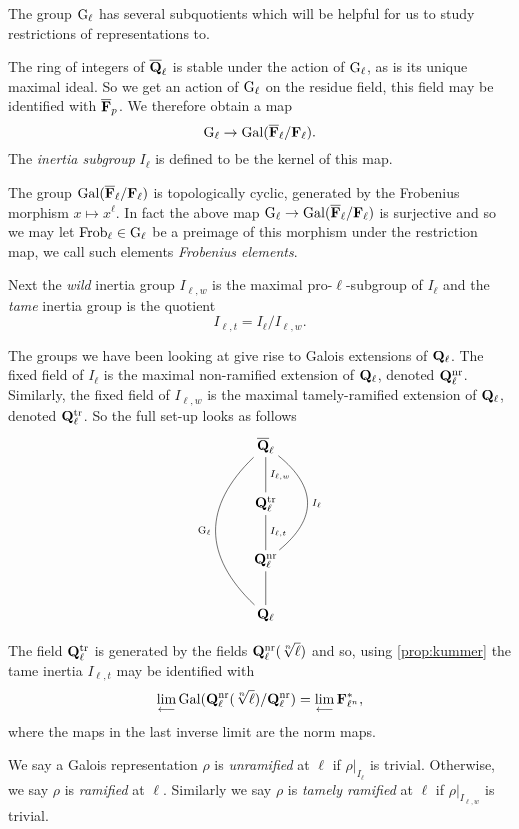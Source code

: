 \documentclass[a4paper,12pt]{article}
\begin{document}
The group $\mathrm{G}_\ell$ has several subquotients which will be helpful for us to study restrictions of representations to.
\begin{defn}\label{def:inert}
The ring of integers of $\overline{\mathbf{Q}}_\ell$ is stable under the action of $\mathrm{G}_\ell$, as is its unique maximal ideal.
So we get an action of $\mathrm{G}_\ell$ on the residue field, this field may be identified with $\overline{\mathbf{F}}_p$.
We therefore obtain a map
\[
\mathrm{G}_\ell \to \operatorname{Gal}(\overline{\mathbf{F}}_\ell/\mathbf{F}_\ell).
\]
The \emph{inertia subgroup} $I_\ell$ is defined to be the kernel of this map.

The group $\operatorname{Gal}(\overline{\mathbf{F}}_\ell/\mathbf{F}_\ell)$ is topologically cyclic, generated by the Frobenius morphism $x \mapsto x^\ell$.
In fact the above map $\mathrm{G}_\ell \to \operatorname{Gal}(\overline{\mathbf{F}}_\ell/\mathbf{F}_\ell)$ is surjective and so we may let $\operatorname{Frob}_\ell\in \mathrm{G}_\ell$ be a preimage of this morphism under the restriction map, we call such elements \emph{Frobenius elements}.



Next the \emph{wild} inertia group $I_{\ell,w}$ is the maximal pro-$\ell$-subgroup of $I_\ell$ and the \emph{tame} inertia group is the quotient
\[
I_{\ell,t} = I_\ell / I_{\ell,w}.
\]
\end{defn}

The groups we have been looking at give rise to Galois extensions of $\mathbf{Q}_\ell$.
The fixed field of $I_\ell$ is the maximal non-ramified extension of $\mathbf{Q}_\ell$, denoted $\mathbf{Q}_\ell^{\mathrm{nr}}$.
Similarly, the fixed field of $I_{\ell,w}$ is the maximal tamely-ramified extension of $\mathbf{Q}_\ell$, denoted $\mathbf{Q}_\ell^{\mathrm{tr}}$.
So the full set-up looks as follows
\[
\xymatrix{
\Qlb      \ar@{-}[d]^{I_{\ell,w}} \ar@{-}@/_3pc/[ddd]_{\Gl} \ar@{-}@/^2.5pc/[dd]^{I_{\ell}}\\
\Ql^\tamr \ar@{-}[d]^{I_{\ell,t}} \\
\Ql^\nr   \ar@{-}[d] \\
\Ql
}
\]

The field $\mathbf{Q}_{\ell}^{\mathrm{tr}}$ is generated by the fields $\mathbf{Q}_\ell^{\mathrm{nr}}(\sqrt[n]{\ell})$ \cite{Frohlich} and so, using \cref{prop:kummer} the tame inertia $I_{\ell,t}$ may be identified with
\[
\lim_{\longleftarrow} \operatorname{Gal}(\mathbf{Q}_\ell^{\mathrm{nr}}(\sqrt[n]{\ell})/\mathbf{Q}_\ell^{\mathrm{nr}})= \lim_{\longleftarrow} \mathbf{F}_{\ell^n}^*,
\]
where the maps in the last inverse limit are the norm maps.

\begin{defn}
We say a Galois representation $\rho$ is \emph{unramified} at $\ell$ if $\rho|_{I_\ell}$ is trivial.
Otherwise, we say $\rho$ is \emph{ramified} at $\ell$.
Similarly we say $\rho$ is \emph{tamely ramified} at $\ell$ if $\rho|_{I_{\ell,w}}$ is trivial.
\end{defn}
\end{document}
